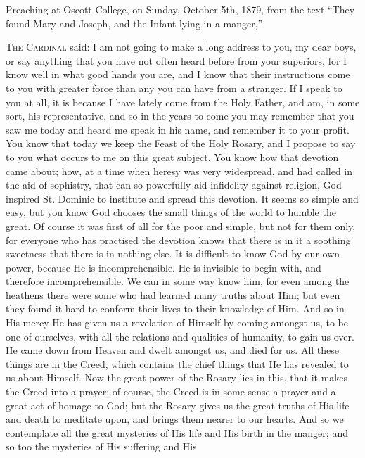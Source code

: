 
Preaching at Oscott College, on
Sunday, October 5th, 1879, from the text ``They found Mary and Joseph,
and the Infant lying in a manger,''

T\textsc{he} C\textsc{ardinal}
said: I am not going to make a long address to you, my dear boys, or
say anything that you have not often heard before from your superiors,
for I know well in what good hands you are, and I know that their
instructions come to you with greater force than any you can have from
a stranger. If I speak to you at all, it is because I have lately come
from the Holy Father, and am, in some sort, his representative, and so
in the years to come you may remember that you saw me today and heard
me speak in his name, and remember it to your profit. You know that
today we keep the Feast of the Holy Rosary, and I propose to say to
you what occurs to me on this great subject. You know how that
devotion came about; how, at a time when heresy was very widespread,
and had called in the aid of sophistry, that can so powerfully aid
infidelity against religion, God inspired St. Dominic to institute and
spread this devotion. It seems so simple and easy, but you know God
chooses the small things of the world to humble the great. Of course
it was first of all for the poor and simple, but not for them only,
for everyone who has practised the devotion knows that there is in it
a soothing sweetness that there is in nothing else. It is difficult to
know God by our own power, because He is incomprehensible. He is
invisible to begin with, and therefore incomprehensible. We can in
some way know him, for even among the heathens there were some who had
learned many truths about Him; but even they found it hard to conform
their lives to their knowledge of Him. And so in His mercy He has
given us a revelation of Himself by coming amongst us, to be one of
ourselves, with all the relations and qualities of humanity, to gain
us over. He came down from Heaven and dwelt amongst us, and died for
us. All these things are in the Creed, which contains the chief things
that He has revealed to us about Himself. Now the great power of the
Rosary lies in this, that it makes the Creed into a prayer; of course,
the Creed is in some sense a prayer and a great act of homage to God;
but the Rosary gives us the great truths of His life and death to
meditate upon, and brings them nearer to our hearts. And so we
contemplate all the great mysteries of His life and His birth in the
manger; and so too the mysteries of His suffering and His
